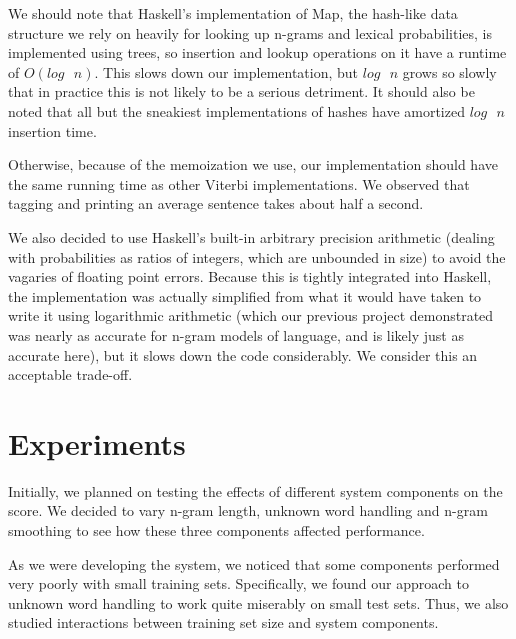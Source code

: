 \documentclass{article}
\begin{document}
We should note that Haskell's implementation of Map, the hash-like data
structure we rely on heavily for looking up n-grams and lexical probabilities, is
implemented using trees, so insertion and lookup operations on it have a runtime
of $O(log\text{ } n)$.  This slows down our implementation, but $log\text{ } n$ grows so slowly
that in practice this is not likely to be a serious detriment.  It should also
be noted that all but the sneakiest implementations of hashes have amortized
$log\text{ } n$  insertion time.

Otherwise, because of the memoization we use, our implementation should have the
same running time as other Viterbi implementations.  We observed that tagging
and printing an average sentence takes about half a second.

We also decided to use Haskell's built-in arbitrary precision arithmetic
(dealing with probabilities as ratios of integers, which are unbounded in size) to
avoid the vagaries of floating point errors.  Because this is tightly integrated
into Haskell, the implementation was actually simplified from what it would have
taken to write it using logarithmic arithmetic (which our previous project
demonstrated was nearly as accurate for n-gram models of language, and is likely
just as accurate here), but it slows down the code considerably.  We consider
this an acceptable trade-off.

\section{Experiments}
Initially, we planned on testing the effects of different system components
on the score. We decided to vary n-gram length, unknown word handling and
n-gram smoothing to see how these three components affected performance.

As we were developing the system, we noticed that some components performed
very poorly with small training sets. Specifically, we found our approach to
unknown word handling to work quite miserably on small test sets. Thus,
we also studied interactions between training set size and system components.
\end{document}
